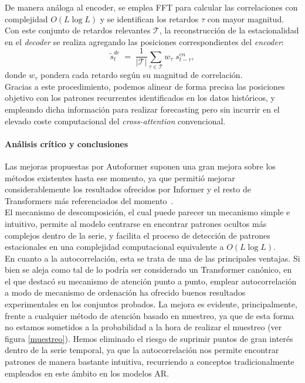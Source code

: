 De manera análoga al encoder, se emplea FFT para calcular las correlaciones con complejidad $O(L \log L)$ y se identifican los retardos $\tau$ con mayor magnitud. Con este conjunto de retardos relevantes $\mathcal{T}$, la reconstrucción de la estacionalidad en el \textit{decoder} se realiza agregando las posiciones correspondientes del \textit{encoder}:
\begin{equation}
	\tilde{s}^{de}_t \;=\; \frac{1}{|\mathcal{T}|} \sum_{\tau \in \mathcal{T}} w_\tau \; s^{en}_{t-\tau},
\end{equation}
donde $w_\tau$ pondera cada retardo según su magnitud de correlación.\\

Gracias a este procedimiento, podemos alinear de forma precisa las posiciones objetivo con los patrones recurrentes identificados en los datos históricos, y empleando dicha información para realizar forecasting pero sin incurrir en el elevado coste computacional del \textit{cross-attention} convencional.

\paragraph{Análisis crítico y conclusiones}

Las mejoras propuestas por Autoformer suponen una gran mejora sobre los métodos existentes hasta ese momento, ya que permitió mejorar considerablemente los resultados ofrecidos por Informer y el resto de Transformers más referenciados del momento~\cite{wu2022autoformerdecompositiontransformersautocorrelation}.\\

El mecanismo de descomposición, el cual puede parecer un mecanismo simple e intuitivo, permite al modelo centrarse en encontrar patrones ocultos más complejos dentro de la serie, y facilita el proceso de detección de patrones estacionales en una complejidad computacional equivalente a \(O(L \log L)\).\\

En cuanto a la autocorrelación, esta se trata de una de las principales ventajas. Si bien se aleja como tal de lo podría ser considerado un Transformer canónico, en el que destacó su mecanismo de atención punto a punto, emplear autocorrelación a modo de mecanismo de ordenación ha ofrecido buenos resultados experimentales en los conjuntos probados. La mejora es evidente, principalmente, frente a cualquier método de atención basado en muestreo, ya que de esta forma no estamos sometidos a la probabilidad a la hora de realizar el muestreo (ver figura \ref{muestreo}). Hemos eliminado el riesgo de suprimir puntos de gran interés dentro de la serie temporal, ya que la autocorrelación nos permite encontrar patrones de manera bastante intuitiva, recurriendo a conceptos tradicionalmente empleados en este ámbito en los modelos AR. 
	
